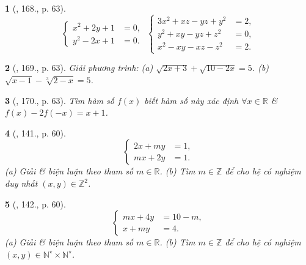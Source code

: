 \documentclass{article}
\newtheorem{baitoan}{}
\begin{document}
\begin{baitoan}[\cite{Tuyen_Toan_9_old}, 168., p. 63]
	\begin{equation*}
		\left\{\begin{split}
			x^2 + 2y + 1 &= 0,\\
			y^2 - 2x + 1 &= 0.
		\end{split}\right.\ \left\{\begin{split}
			3x^2 + xz - yz + y^2 &= 2,\\
			y^2 + xy - yz + z^2 &= 0,\\
			x^2 - xy - xz - z^2 &= 2.
		\end{split}\right.
	\end{equation*}
\end{baitoan}

\begin{baitoan}[\cite{Tuyen_Toan_9_old}, 169., p. 63]
	Giải phương trình: (a) $\sqrt{2x + 3} + \sqrt{10 - 2x} = 5$. (b) $\sqrt{x - 1} - \sqrt[3]{2 - x} = 5$.
\end{baitoan}

\begin{baitoan}[\cite{Tuyen_Toan_9_old}, 170., p. 63]
	Tìm hàm số $f(x)$ biết hàm số này xác định $\forall x\in\mathbb{R}$ \& $f(x) - 2f(-x) = x + 1$.
\end{baitoan}

\begin{baitoan}[\cite{Dong_23_1001_toan_I}, 141., p. 60]
	\begin{equation*}
		\left\{\begin{split}
			2x + my &= 1,\\
			mx + 2y &= 1.
		\end{split}\right.
	\end{equation*}
	(a) Giải \& biện luận theo tham số $m\in\mathbb{R}$. (b) Tìm $m\in\mathbb{Z}$ để cho hệ có nghiệm duy nhất $(x,y)\in\mathbb{Z}^2$.
\end{baitoan}

\begin{baitoan}[\cite{Dong_23_1001_toan_I}, 142., p. 60]
	\begin{equation*}
		\left\{\begin{split}
			mx + 4y &= 10 - m,\\
			x + my &= 4.
		\end{split}\right.
	\end{equation*}
	(a) Giải \& biện luận theo tham số $m\in\mathbb{R}$. (b) Tìm $m\in\mathbb{Z}$ để cho hệ có nghiệm $(x,y)\in\mathbb{N}^\star\times\mathbb{N}^\star$.
\end{baitoan}
\end{document}
